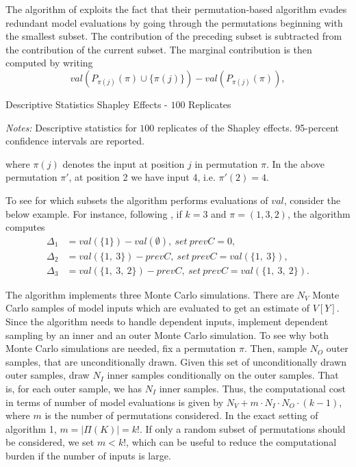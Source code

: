 The algorithm of \citet{SNS16} exploits the fact that their permutation-based algorithm evades redundant model evaluations by going through the permutations beginning with the smallest subset. The contribution of the preceding subset is subtracted from the contribution of the current subset. The marginal contribution is then computed by writing
\begin{equation*}
val(P_{\pi(j)}(\pi) \cup \{\pi(j)\}) - val(P_{\pi(j)}(\pi)),
\end{equation*}

\begin{table}[t]
	\centering
	\caption{Descriptive Statistics Shapley Effects - $100$ Replicates}
	\label{shapley_descriptives}
	\begin{threeparttable}
	\centering
	
	\begin{tablenotes}
	\small
	\item \textit{Notes:} Descriptive statistics for $100$ replicates of the Shapley effects. 95-percent confidence intervals are reported.
	\end{tablenotes}
	\end{threeparttable}
\end{table}

\noindent where $\pi(j)$ denotes the input at position $j$ in permutation $\pi$. In the above permutation $\pi'$, at position 2 we have input 4, i.e. $\pi'(2)=4$.

To see for which subsets the algorithm performs evaluations of $val$, consider the below example. For instance, following \citet{SNS16}, if $k=3$ and $\pi=(1, 3, 2)$, the algorithm computes
\begin{align*}
\Delta_1 &=val(\{1\})-val(\emptyset),\ set\ prevC=0, \\
\Delta_2 &=val(\{1,\ 3\})-prevC,\ set\ prevC=val(\{1,\ 3\}), \\
\Delta_3 &=val(\{1,\ 3,\ 2\})-prevC,\ set\ prevC=val(\{1,\ 3,\ 2\}).
\end{align*}

The algorithm implements three Monte Carlo simulations. There are $N_V$ Monte Carlo samples of model inputs which are evaluated to get an estimate of $V[Y]$. Since the algorithm needs to handle dependent inputs, \citet{SNS16} implement dependent sampling by an inner and an outer Monte Carlo simulation. To see why both Monte Carlo simulations are needed, fix a permutation $\pi$. Then, sample $N_O$ outer samples, that are unconditionally drawn. Given this set of unconditionally drawn outer samples, draw $N_I$ inner samples conditionally on the outer samples. That is, for each outer sample, we has $N_I$ inner samples. Thus, the computational cost in terms of number of model evaluations is given by $N_V+m \cdot N_I \cdot N_O \cdot (k-1)$, where $m$ is the number of permutations considered. In the exact setting of algorithm 1, $m=\vert \Pi(K) \vert=k!$. If only a random subset of permutations should be considered, we set $m<k!$, which can be useful to reduce the computational burden if the number of inputs is large.

